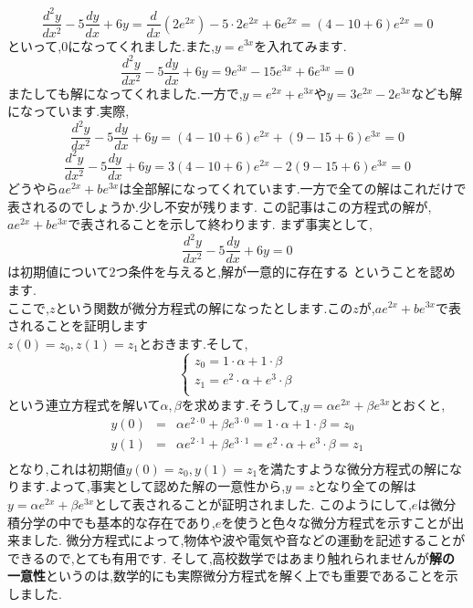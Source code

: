 \[
\frac{d^2 y}{dx^2} - 5 \frac{dy}{dx} + 6y =  \frac{d}{dx}(2e^{2x})  - 5 \cdot 2e^{2x} + 6 e^{2x} = (4-10+6)e^{2x} =0
\]
といって,$0$になってくれました.また,$y=e^{3x}$を入れてみます.
\[
\frac{d^2 y}{dx^2} - 5 \frac{dy}{dx} + 6y =  9 e^{3x} - 15 e^{3x} + 6e^{3x} = 0
\]
またしても解になってくれました.一方で,$y=e^{2x} + e^{3x}$や$y = 3e^{2x} - 2e^{3x}$なども解になっています.実際,
\[
 \frac{d^2 y}{dx^2} - 5 \frac{dy}{dx} + 6y = (4-10+6)e^{2x} + (9 -15 + 6)e^{3x} = 0
\]
\[
 \frac{d^2 y}{dx^2} - 5 \frac{dy}{dx} + 6y = 3(4-10+6)e^{2x} - 2(9 -15 + 6)e^{3x} = 0
\]
どうやら$ae^{2x} + be^{3x}$は全部解になってくれています.一方で全ての解はこれだけで表されるのでしょうか.少し不安が残ります.
この記事はこの方程式の解が,$ae^{2x} + be^{3x}$で表されることを示して終わります.
\exx
まず事実として,
\thm
\[
\frac{d^2 y}{dx^2} - 5 \frac{dy}{dx} + 6y = 0
\]
は初期値について$2$つ条件を与えると,解が一意的に存在する
\thmx
ということを認めます.\\
\proof
ここで,$z$という関数が微分方程式の解になったとします.この$z$が,$ae^{2x} + be^{3x}$で表されることを証明します\\
$z(0) = z_0 ,z(1) = z_1$とおきます.そして,
\begin{equation*}
\begin{cases}
z_0    = 1\cdot\alpha + 1 \cdot \beta   \\
z_1    = e^2 \cdot\alpha + e^3 \cdot\beta \\
\end{cases}  
\end{equation*}
という連立方程式を解いて$\alpha,\beta$を求めます.そうして,$y = \alpha e^{2x} + \beta e^{3x}$とおくと,
\begin{eqnarray*}
y(0) &=& \alpha e^{2\cdot 0} + \beta e^{3\cdot 0}  = 1\cdot\alpha + 1 \cdot \beta  = z_0\\
y(1) &=& \alpha e^{2\cdot 1} + \beta e^{3\cdot 1}  =e^2 \cdot\alpha + e^3 \cdot\beta = z_1\\
\end{eqnarray*}
となり,これは初期値$y(0) =z_0 , y(1) =z_1$を満たすような微分方程式の解になります.よって,事実として認めた解の一意性から,$y=z$となり全ての解は$y = \alpha e^{2x} + \beta e^{3x}$として表されることが証明されました.
\proofx
{}
このようにして,$e$は微分積分学の中でも基本的な存在であり,$e$を使うと色々な微分方程式を示すことが出来ました.
微分方程式によって,物体や波や電気や音などの運動を記述することができるので,とても有用です.
そして,高校数学ではあまり触れられませんが{\bf 解の一意性}というのは,数学的にも実際微分方程式を解く上でも重要であることを示しました.
